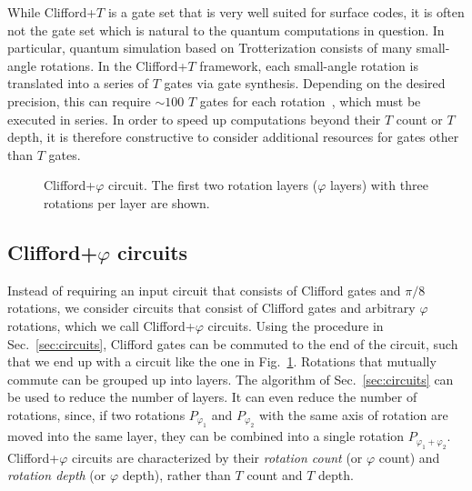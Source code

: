 \documentclass[prx,aps,letterpaper,twocolumn,allowfontchageintitle=true,accepted=2019-02-01]{quantumarticle}
\begin{document}
While Clifford+$T$ is a gate set that is very well suited for surface codes, it is often not the gate set which is natural to the quantum computations in question. In particular, quantum simulation based on Trotterization consists of many small-angle rotations. In the Clifford+$T$ framework, each small-angle rotation is translated into a series of $T$ gates via gate synthesis. Depending on the desired precision, this can require ${\sim}100$ $T$ gates for each rotation~\cite{Ross2014}, which must be executed in series. In order to speed up computations beyond their $T$ count or $T$ depth, it is therefore constructive to consider additional resources for gates other than $T$ gates.


\begin{figure}[t!]
\centering
\def\svgwidth{\linewidth}

\caption{Clifford+$\varphi$ circuit. The first two rotation layers ($\varphi$ layers) with three rotations per layer are shown.}
\label{fig:rotationlayers}
\end{figure}

\subsection{Clifford+$\varphi$ circuits}

Instead of requiring an input circuit that consists of Clifford gates and $\pi/8$ rotations, we consider circuits that consist of Clifford gates and arbitrary $\varphi$ rotations, which we call Clifford+$\varphi$ circuits. Using the procedure in Sec.~\ref{sec:circuits}, Clifford gates can be commuted to the end of the circuit, such that we end up with a circuit like the one in Fig.~\ref{fig:rotationlayers}. Rotations that mutually commute can be grouped up into layers. The algorithm of Sec.~\ref{sec:circuits} can be used to reduce the number of layers. It can even reduce the number of rotations, since, if two rotations $P_{\varphi_1}$ and $P_{\varphi_2}$ with the same axis of rotation are moved into the same layer, they can be combined into a single rotation $P_{\varphi_1+\varphi_2}$. Clifford+$\varphi$ circuits are characterized by their \textit{rotation count} (or $\varphi$ count) and \textit{rotation depth} (or $\varphi$ depth), rather than $T$ count and $T$ depth.
\end{document}
